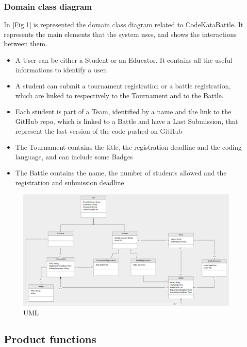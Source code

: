 \documentclass[12pt,oneside,a4paper]{article}
\begin{document}
\subsubsection{Domain class diagram}

In [Fig.1] is represented the domain class diagram related to CodeKataBattle. It represents the main elements that the system uses, and shows the interactions between them.
\begin{itemize}
    \item A User can be either a Student or an Educator. It contains all the useful informations to identify a user.
    \item A student can submit a tournament registration or a battle registration, which are linked to respectively to the Tournament and to the Battle. 
    \item Each student is part of a Team, identified by a name and the link to the GitHub repo, which is linked to a Battle and have a Last Submission, that represent the last version of the code pushed on GitHub
    \item The Tournament contains the title, the registration deadline and the coding language, and can include some Badges
    \item The Battle contains the name, the number of students allowed and the registration and submission deadline
\end{itemize}

\begin{figure}[H]
    \centering
    \includegraphics[width=1\linewidth]{Images/Diagrams/UML.png}
    \caption{UML}
    \label{fig:enter-label}
\end{figure}

\subsection{Product functions}
\end{document}
